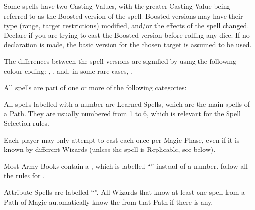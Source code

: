 \vspace*{15pt}
\begingroup
	
	\par%
	\begin{center}\end{center}%
\endgroup


Some spells have two Casting Values, with the greater Casting Value being referred to as the Boosted version of the spell. Boosted versions may have their type (range, target restrictions) modified, and/or the effects of the spell changed. Declare if you are trying to cast the Boosted version before rolling any dice. If no declaration is made, the basic version for the chosen target is assumed to be used.

The differences between the spell versions are signified by using the following colour coding: , , and, in some rare cases, .

\newpage
{}

All spells are part of one or more of the following categories:

\basicsubsubtitle{\learnedspells}

All spells labelled with a number are Learned Spells, which are the main spells of a Path. They are usually numbered from 1 to 6, which is relevant for the Spell Selection rules.

Each player may only attempt to cast each \learnedspell{} once per Magic Phase, even if it is known by different Wizards (unless the spell is Replicable, see below).

\basicsubsubtitle{\hereditaryspells}

Most Army Books contain a \hereditaryspell{}, which is labelled \enquote{\textbf{\hereditaryspellnumber}} instead of a number. \hereditaryspells{} follow all the rules for \learnedspells{}.

\basicsubsubtitle{\attributespells}

Attribute Spells are labelled \enquote{\textbf{\attributespellnumber}}. All Wizards that know at least one spell from a Path of Magic automatically know the \attributespell{} from that Path if there is any.

